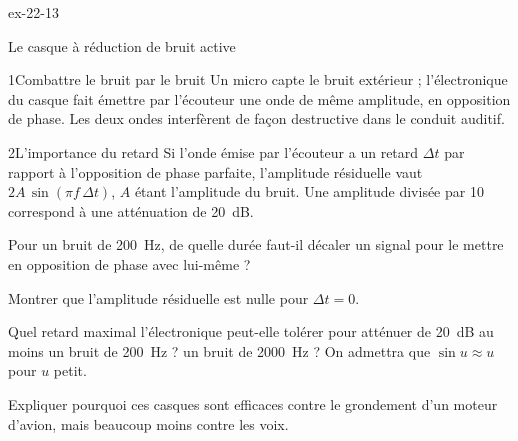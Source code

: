 \begin{blocLivre}{ex-22-13}
\begin{exercice}[3]{Le casque à réduction de bruit active}
\begin{docu}{1}{Combattre le bruit par le bruit}
Un micro capte le bruit extérieur ; l'électronique du casque fait émettre par l'écouteur une onde de même amplitude, en
opposition de phase. Les deux ondes interfèrent de façon destructive dans le conduit auditif.
\end{docu}
\begin{docu}{2}{L'importance du retard}
Si l'onde émise par l'écouteur a un retard $\Delta t$ par rapport à l'opposition de phase parfaite, l'amplitude résiduelle
vaut $2A\,\sin(\pi f\,\Delta t)$, $A$ étant l'amplitude du bruit. Une amplitude divisée par 10 correspond à une atténuation
de \qty{20}{dB}.
\end{docu}
\begin{questions}
\item Pour un bruit de \qty{200}{Hz}, de quelle durée faut-il décaler un signal pour le mettre en opposition de phase avec
lui-même ?
\item Montrer que l'amplitude résiduelle est nulle pour $\Delta t=0$.
\item \initiative Quel retard maximal l'électronique peut-elle tolérer pour atténuer de \qty{20}{dB} au moins un bruit de
\qty{200}{Hz} ? un bruit de \qty{2000}{Hz} ? On admettra que $\sin u\approx u$ pour $u$ petit.
\item Expliquer pourquoi ces casques sont efficaces contre le grondement d'un moteur d'avion, mais beaucoup moins contre
les voix.
\end{questions}
\end{exercice}
\end{blocLivre}
